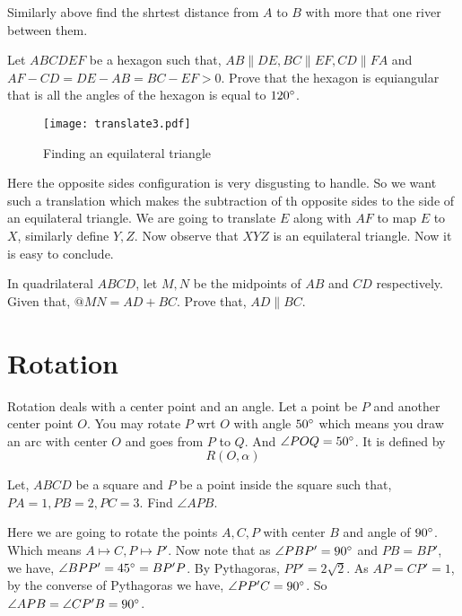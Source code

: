 \begin{problem}
Similarly above find the shrtest distance from $A$ to $B$ with more that one river between them.
\end{problem}

\begin{example}
Let $ABCDEF$ be a hexagon such that, $AB\parallel DE, BC \parallel EF, CD \parallel FA$ and $AF-CD=DE-AB = BC -EF >0$. Prove that the hexagon is equiangular that is all the angles of the hexagon is equal  to $120^\circ$.
\end{example}

\begin{figure}[ht]
\centering
	\texttt{[image: translate3.pdf]}
	\caption{Finding an equilateral triangle}
\end{figure}

Here the opposite sides configuration is very disgusting to handle. So we want such a translation which makes the subtraction of th opposite sides to the side of an equilateral triangle. We are going to translate $E$ along with $AF$ to map $E$ to $X$, similarly define $Y,Z$. Now observe that $XYZ$ is an equilateral triangle. Now it is easy to conclude.


\begin{example}
In quadrilateral $ABCD$, let $M,N$ be the midpoints of $AB$ and $CD$ respectively. Given that, $@MN=AD+BC$. Prove that, $AD\parallel BC$. 
\end{example}

\section{Rotation}
Rotation deals with a center point and an angle. Let a point be $P$ and another center point $O$. You may rotate $P$ wrt $O$ with angle $50^\circ$ which means you draw an arc with center $O$ and goes from $P$ to $Q$.
And $\angle POQ =50^\circ$.
It is defined by \[R(O,\alpha)\]
\begin{example}
Let, $ABCD$ be a square and $P$ be a point inside the square such that, $PA=1, PB=2, PC=3$. Find $\angle APB$.
\end{example}

Here we are going to rotate the points $A,C,P$ with center $B$ and angle of $90^\circ$. Which means $A\mapsto C, P\mapsto P'$. Now note that as $\angle PBP'=90^\circ$ and $PB=BP'$, we have, $\angle BPP'=45^\circ=BP'P$. By Pythagoras, $PP'=2\sqrt 2$. As $AP =CP'=1$,  by the converse of Pythagoras we have, $\angle PP'C =90^\circ$. So $\angle APB = \angle CP'B =90^\circ$.

